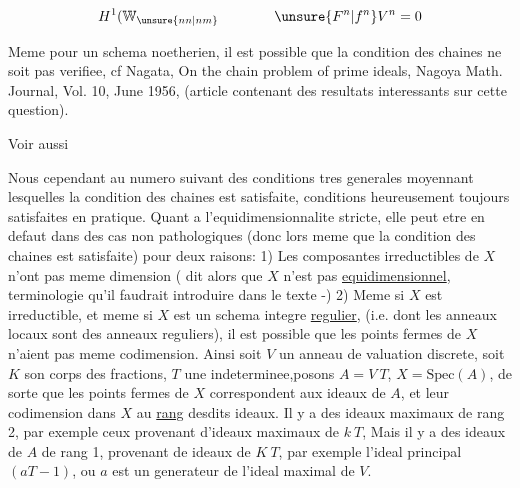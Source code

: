 \[
H^1(\mathbb W_{\unsure{nn|nm}}\qquad\qquad \unsure{F^n|f^n}V^n=0
\]


Meme pour un schema  noetherien, il est possible que la condition
des chaines ne soit pas verifiee, cf Nagata, On the chain problem of
prime ideals, Nagoya Math. Journal, Vol. 10, June 1956, 
(article contenant des resultats interessants sur cette question).

Voir aussi

Nous  cependant au numero suivant des conditions tres generales
moyennant lesquelles la condition des chaines est satisfaite, conditions
heureusement toujours satisfaites en pratique. Quant a l'equidimensionnalite
stricte, elle peut etre en defaut dans des cas non
pathologiques (donc lors meme que la condition des chaines est satisfaite)
pour deux raisons: 1) Les composantes irreductibles de $X$ n'ont
pas meme dimension  ( dit alors que $X$ n'est pas \uline{equidimensionnel}\deleted{\unsure{)}},
terminologie qu'il faudrait introduire dans le texte -) 2) Meme si
$X$ est irreductible, et meme si $X$ est un schema integre \uline{regulier}, (i.e.
dont les anneaux locaux sont des anneaux reguliers), il est possible
que les points fermes de $X$ n'aient pas meme codimension. Ainsi soit $V$
un anneau de valuation discrete, soit $K$ son corps des fractions,  $T$ une
indeterminee,posons $A=V\ T$, $X=\mathrm{Spec}(A)$, de sorte que les points
fermes de $X$ correspondent aux ideaux  de $A$, et leur codimension
dans $X$ au \uline{rang} desdits ideaux. Il y a des ideaux maximaux de 
rang 2, par exemple ceux provenant d'ideaux maximaux de $k\ T$, 
 Mais  il y a des ideaux
 de $A$ de rang 1, provenant de  ideaux  de $K\ T$,
par exemple l'ideal principal $(aT-1)$, ou $a$ est un generateur de
l'ideal maximal de $V$.

